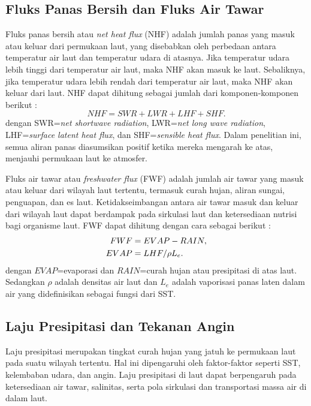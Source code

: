 \begin{spacing}{1.5}
	\subsection[Fluks Panas Bersih dan Fluks Air Tawar]{Fluks Panas Bersih dan Fluks Air Tawar}
	
	Fluks panas bersih atau \textit{net heat flux} (NHF) adalah jumlah panas yang masuk atau keluar dari permukaan laut, yang disebabkan oleh perbedaan antara temperatur air laut dan temperatur udara di atasnya. Jika temperatur udara lebih tinggi dari temperatur air laut, maka NHF akan masuk ke laut. Sebaliknya, jika temperatur udara lebih rendah dari temperatur air laut, maka NHF akan keluar dari laut. NHF dapat dihitung sebagai jumlah dari komponen-komponen berikut \cite{Tomita2021}: 
	\begin{equation}\label{eq:NHF}
		NHF = SWR + LWR + LHF + SHF.
	\end{equation} 
	dengan SWR=\textit{net shortwave radiation}, LWR=\textit{net long wave radiation}, LHF=\textit{surface latent heat flux}, dan SHF=\textit{sensible heat flux}. Dalam penelitian ini, semua aliran panas diasumsikan positif ketika mereka mengarah ke atas, menjauhi permukaan laut ke atmosfer.
	
	Fluks air tawar atau \textit{freshwater flux} (FWF) adalah jumlah air tawar yang masuk atau keluar dari wilayah laut tertentu, termasuk curah hujan, aliran sungai, penguapan, dan es laut. Ketidakseimbangan antara air tawar masuk dan keluar dari wilayah laut dapat berdampak pada sirkulasi laut dan ketersediaan nutrisi bagi organisme laut. FWF dapat dihitung dengan cara sebagai berikut \cite{Tomita2019}:
	\begin{equation}\label{eq:FWF}\\
		\begin{aligned}
		FWF &= EVAP-RAIN, \\
		EVAP &= LHF/{\rho L_e}.
		\end{aligned}
	\end{equation} 
	dengan $EVAP$=evaporasi dan $RAIN$=curah hujan atau presipitasi di atas laut. Sedangkan $\rho$ adalah densitas air laut dan $L_e$ adalah  vaporisasi panas laten dalam air yang didefinisikan sebagai fungsi dari SST.
	\subsection[Laju Presipitasi dan Tekanan Angin]{Laju Presipitasi dan Tekanan Angin}
	Laju presipitasi merupakan tingkat curah hujan yang jatuh ke permukaan laut pada suatu wilayah tertentu. Hal ini dipengaruhi oleh faktor-faktor seperti SST, kelembaban udara, dan angin. Laju presipitasi di laut dapat berpengaruh pada ketersediaan air tawar, salinitas, serta pola sirkulasi dan transportasi massa air di dalam laut. 
	

\end{spacing}
